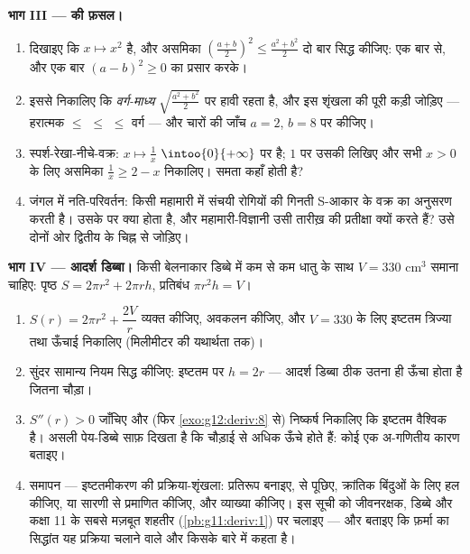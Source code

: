\begin{problem}
\medskip
\noindent\textbf{भाग III ---  की फ़सल।}
\begin{enumerate}[resume]
  \item दिखाइए कि $x \mapsto x^2$  है, और  असमिका $\left(\frac{a + b}{2}\right)^2 \leq
        \frac{a^2 + b^2}{2}$ दो बार सिद्ध
        कीजिए: एक बार  से, और एक बार $(a - b)^2 \geq 0$ का प्रसार करके।
  \item इससे निकालिए कि \emph{वर्ग-माध्य} $\sqrt{\frac{a^2 + b^2}{2}}$   पर हावी रहता
        है, और इस शृंखला की पूरी कड़ी जोड़िए --- हरात्मक $\leq$  $\leq$
         $\leq$ वर्ग --- और चारों की जाँच $a = 2$, $b = 8$ पर कीजिए।
  \item स्पर्श-रेखा-नीचे-वक्र: $x \mapsto \frac1x$ $\intoo{0}{+\infty}$ पर  है; $1$ पर उसकी  लिखिए और सभी $x > 0$ के लिए असमिका $\frac1x \geq 2 - x$ निकालिए। समता कहाँ
        होती है?
  \item जंगल में नति-परिवर्तन: किसी महामारी में संचयी रोगियों की गिनती
        S-आकार के वक्र का अनुसरण करती है। उसके  पर क्या
        होता है, और महामारी-विज्ञानी उसी तारीख़ की प्रतीक्षा क्यों करते हैं?
        उसे दोनों ओर द्वितीय  के चिह्न से जोड़िए।
\end{enumerate}

\medskip
\noindent\textbf{भाग IV --- आदर्श डिब्बा।}
किसी बेलनाकार डिब्बे में कम से कम धातु के साथ $V = 330$ cm$^3$ समाना चाहिए:
पृष्ठ $S = 2\pi r^2 + 2\pi r h$, प्रतिबंध $\pi r^2 h = V$।
\begin{enumerate}[resume]
  \item $S(r) = 2\pi r^2 + \dfrac{2V}{r}$ व्यक्त कीजिए, अवकलन कीजिए, और $V = 330$ के लिए इष्टतम त्रिज्या
        तथा ऊँचाई निकालिए (मिलीमीटर की यथार्थता तक)।
  \item सुंदर सामान्य नियम सिद्ध कीजिए: इष्टतम पर $h = 2r$ --- आदर्श डिब्बा ठीक
        उतना ही ऊँचा होता है जितना चौड़ा।
  \item $S''(r) > 0$ जाँचिए और (फिर \cref{exo:g12:deriv:8} से) निष्कर्ष निकालिए कि इष्टतम वैश्विक
        है। असली पेय-डिब्बे साफ़ दिखता है कि चौड़ाई से अधिक ऊँचे होते हैं:
        कोई एक अ-गणितीय कारण बताइए।
  \item समापन --- इष्टतमीकरण की प्रक्रिया-शृंखला: प्रतिरूप बनाइए,  से
        पूछिए, क्रांतिक बिंदुओं के लिए हल कीजिए,  या सारणी से
        प्रमाणित कीजिए, और व्याख्या कीजिए। इस सूची को जीवनरक्षक, डिब्बे और
        कक्षा 11 के सबसे मज़बूत शहतीर (\cref{pb:g11:deriv:1}) पर चलाइए --- और बताइए कि
        फ़र्मा का सिद्धांत यह प्रक्रिया चलाने वाले और किसके बारे में कहता है।
\end{enumerate}
\end{problem}
